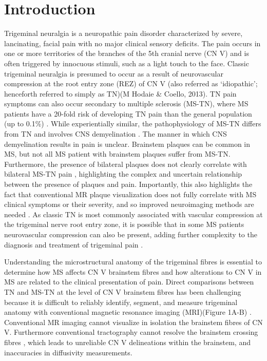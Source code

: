 \section{Introduction}
Trigeminal neuralgia is a neuropathic pain disorder characterized by severe, lancinating, facial pain with no major clinical sensory deficits. The pain occurs in one or more territories of the branches of the 5th cranial nerve (CN V) and is often triggered by innocuous stimuli, such as a light touch to the face. Classic trigeminal neuralgia is presumed to occur as a result of neurovascular compression at the root entry zone (REZ) of CN V (also referred as ‘idiopathic’; henceforth referred to simply as TN)(M Hodaie \& Coello, 2013). TN pain symptoms can also occur secondary to multiple sclerosis (MS-TN), where MS patients have a 20-fold risk of developing TN pain than the general population (up to 0.1\%) \cite{VanHecke2014}. 
While experientially similar, the pathophysiology of MS-TN differs from TN and involves CNS demyelination \cite{lazar1979trigeminal,Nurmikko2009}. The manner in which CNS demyelination results in pain is unclear. Brainstem plaques can be common in MS, but not all MS patient with brainstem plaques suffer from MS-TN. Furthermore, the presence of bilateral plaques does not clearly correlate with bilateral MS-TN pain \cite{DeSanti2011a,Love2001a}, highlighting the complex and uncertain relationship between the presence of plaques and pain\cite{DaSilva2005}. Importantly, this also highlights the fact that conventional MR plaque visualization does not fully correlate with MS clinical symptoms or their severity, and so improved neuroimaging methods are needed \cite{Seixas2014}. As classic TN is most commonly associated with vascular compression at the trigeminal nerve root entry zone, it is possible that in some MS patients neurovascular compression can also be present, adding further complexity to the diagnosis and treatment of trigeminal pain \cite{Sandell2010e}.

Understanding the microstructural anatomy of the trigeminal fibres is essential to determine how MS affects CN V brainstem fibres and how alterations to CN V in MS are related to the clinical presentation of pain. Direct comparisons between TN and MS-TN at the level of CN V brainstem fibres has been challenging because it is difficult to reliably identify, segment, and measure trigeminal anatomy with conventional magnetic resonance imaging (MRI)(Figure 1A-B) \cite{Cruccu2009,DaSilva2005}. Conventional MR imaging cannot visualize in isolation the brainstem fibres of CN V. Furthermore conventional tractography cannot resolve the brainstem crossing fibres \cite{Farquharson2013}, which leads to unreliable CN V delineations within the brainstem, and inaccuracies in diffusivity measurements. 


